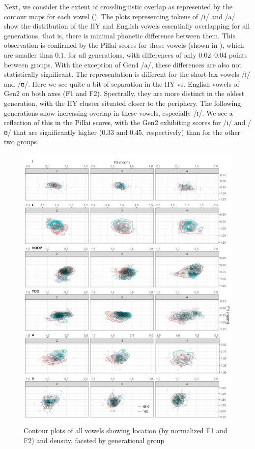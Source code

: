 \documentclass[output=paper]{langsci/langscibook}
\begin{document}
Next, we consider the extent of crosslinguistic overlap as represented by the contour maps for each vowel (). The plots representing tokens of /i/ and /a/ show the distribution of the HY and English vowels essentially overlapping for all generations, that is, there is minimal phonetic difference between them. This observation is confirmed by the Pillai scores for these vowels (shown in ), which are smaller than 0.1, for all generations, with differences of only 0.02--0.04 points between groups. With the exception of Gen4 /a/, these differences are also not statistically significant. The representation is different for the short-lax vowels /ɪ/ and /ʊ/. Here we see quite a bit of separation in the HY vs. English vowels of Gen2 on both axes (F1 and F2). Spectrally, they are more distinct in the oldest generation, with the HY cluster situated closer to the periphery. The following generations show increasing overlap in these vowels, especially /ɪ/. We see a reflection of this in the Pillai scores, with the Gen2 exhibiting scores for /ɪ/ and /ʊ/ that are significantly higher (0.33 and 0.45, respectively) than for the other two groups.


\begin{figure}
\includegraphics[width=\textwidth]{figures/nove-fig8-color.pdf}
\caption{Contour plots of all vowels showing location (by normalized F1 and F2) and density, faceted by generational group}
\label{fig:nove:8}
\end{figure}
\end{document}
